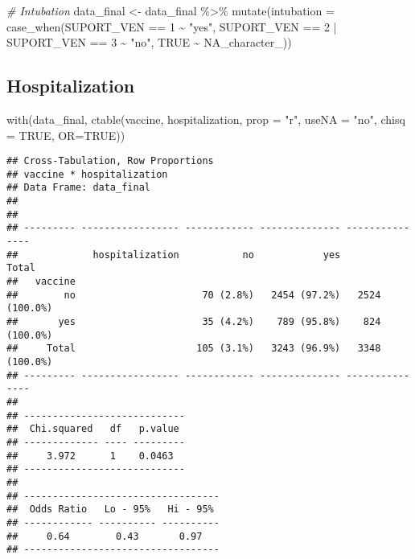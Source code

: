 \documentclass[
]{article}
\newenvironment{Shaded}{\begin{snugshade}}{\end{snugshade}}
\newcommand{\AttributeTok}[1]{\textcolor[rgb]{0.77,0.63,0.00}{#1}}
\newcommand{\CommentTok}[1]{\textcolor[rgb]{0.56,0.35,0.01}{\textit{#1}}}
\newcommand{\ConstantTok}[1]{\textcolor[rgb]{0.00,0.00,0.00}{#1}}
\newcommand{\DecValTok}[1]{\textcolor[rgb]{0.00,0.00,0.81}{#1}}
\newcommand{\FunctionTok}[1]{\textcolor[rgb]{0.00,0.00,0.00}{#1}}
\newcommand{\NormalTok}[1]{#1}
\newcommand{\OtherTok}[1]{\textcolor[rgb]{0.56,0.35,0.01}{#1}}
\newcommand{\SpecialCharTok}[1]{\textcolor[rgb]{0.00,0.00,0.00}{#1}}
\newcommand{\StringTok}[1]{\textcolor[rgb]{0.31,0.60,0.02}{#1}}
\begin{document}
\begin{Shaded}
\begin{Highlighting}[]
\CommentTok{\# Intubation}
\NormalTok{data\_final }\OtherTok{\textless{}{-}}\NormalTok{ data\_final }\SpecialCharTok{\%\textgreater{}\%} 
  \FunctionTok{mutate}\NormalTok{(}\AttributeTok{intubation =} \FunctionTok{case\_when}\NormalTok{(SUPORT\_VEN }\SpecialCharTok{==} \DecValTok{1} \SpecialCharTok{\textasciitilde{}} \StringTok{"yes"}\NormalTok{,}
\NormalTok{                                SUPORT\_VEN }\SpecialCharTok{==} \DecValTok{2} \SpecialCharTok{|}\NormalTok{ SUPORT\_VEN }\SpecialCharTok{==} \DecValTok{3} \SpecialCharTok{\textasciitilde{}} \StringTok{"no"}\NormalTok{,}
                                \ConstantTok{TRUE} \SpecialCharTok{\textasciitilde{}} \ConstantTok{NA\_character\_}\NormalTok{))}
\end{Highlighting}
\end{Shaded}

\hypertarget{hospitalization}{%
\subsection{Hospitalization}\label{hospitalization}}

\begin{Shaded}
\begin{Highlighting}[]
\FunctionTok{with}\NormalTok{(data\_final, }\FunctionTok{ctable}\NormalTok{(vaccine, hospitalization, }\AttributeTok{prop =} \StringTok{"r"}\NormalTok{, }\AttributeTok{useNA =} \StringTok{"no"}\NormalTok{, }\AttributeTok{chisq =} \ConstantTok{TRUE}\NormalTok{, }\AttributeTok{OR=}\ConstantTok{TRUE}\NormalTok{))}
\end{Highlighting}
\end{Shaded}

\begin{verbatim}
## Cross-Tabulation, Row Proportions  
## vaccine * hospitalization  
## Data Frame: data_final  
## 
## 
## --------- ----------------- ------------ -------------- ---------------
##             hospitalization           no            yes           Total
##   vaccine                                                              
##        no                      70 (2.8%)   2454 (97.2%)   2524 (100.0%)
##       yes                      35 (4.2%)    789 (95.8%)    824 (100.0%)
##     Total                     105 (3.1%)   3243 (96.9%)   3348 (100.0%)
## --------- ----------------- ------------ -------------- ---------------
## 
## ----------------------------
##  Chi.squared   df   p.value 
## ------------- ---- ---------
##     3.972      1    0.0463  
## ----------------------------
## 
## ----------------------------------
##  Odds Ratio   Lo - 95%   Hi - 95% 
## ------------ ---------- ----------
##     0.64        0.43       0.97   
## ----------------------------------
\end{verbatim}
\end{document}
